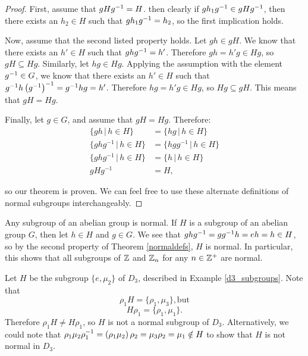 \begin{proof}
First, assume that $gH\inv{g} = H$. then clearly if $gh_1\inv{g} \in gH\inv{g}$, then there exists an $h_2 \in H$ such that $gh_1\inv{g} = h_2$, so the first implication holds.

Now, assume that the second listed property holds. Let $gh \in gH$. We know that there exists an $h' \in H$ such that $gh\inv{g} = h'$. Therefore $gh = h'g \in Hg$, so $gH \subseteq Hg$. Similarly, let $hg \in Hg$. Applying the assumption with the element $\inv{g} \in G$, we know that there exists an $h' \in H$ such that $\inv{g}h\left(\inv{g}\right)^{-1} = \inv{g}hg = h'$. Therefore $hg = h'g \in Hg$, so $Hg \subseteq gH$. This means that $gH = Hg$.

Finally, let $g \in G$, and assume that $gH = Hg$. Therefore:
\begin{align*}
    \{gh \,|\, h \in H\} &= \{hg \,|\, h \in H\} \\
    \{ghg^{-1} \,|\, h \in H\} &= \{hgg^{-1} \,|\, h \in H\} \\
    \{ghg^{-1} \,|\, h \in H\} &= \{h \,|\, h \in H\} \\
    gHg^{-1} &= H,
\end{align*}

so our theorem is proven. We can feel free to use these alternate definitions of normal subgroups interchangeably.

\end{proof}

\begin{example}
Any subgroup of an abelian group is normal. If $H$ is a subgroup of an abelian group $G$, then let $h \in H$ and $g \in G$. We see that $gh\inv g = g \inv g h = eh = h \in H$, so by the second property of Theorem \ref{normaldefs}, $H$ is normal. In particular, this shows that all subgroups of $\z$ and $\zn[n]$ for any $n \in \z^+$ are normal.
\end{example}

\begin{example}
\label{not_normal_d3}
Let $H$ be the subgroup $\{e, \mu_2\}$ of $D_3$, described in Example \ref{d3_subgroups}. Note that
\begin{equation*}
    \rho_1 H = \{\rho_1, \mu_3\}\mathrm{, but}
\end{equation*}
\begin{equation*}
    H \rho_1 = \{\rho_1, \mu_1\}.
\end{equation*}
Therefore $\rho_1 H \neq H\rho_1$, so $H$ is not a normal subgroup of $D_3$. Alternatively, we could note that $\rho_1\mu_2\inv{\rho_1} = \left(\rho_1 \mu_2\right)\rho_2 = \mu_3 \rho_2 = \mu_1 \notin H$ to show that $H$ is not normal in $D_3$.
\end{example}

